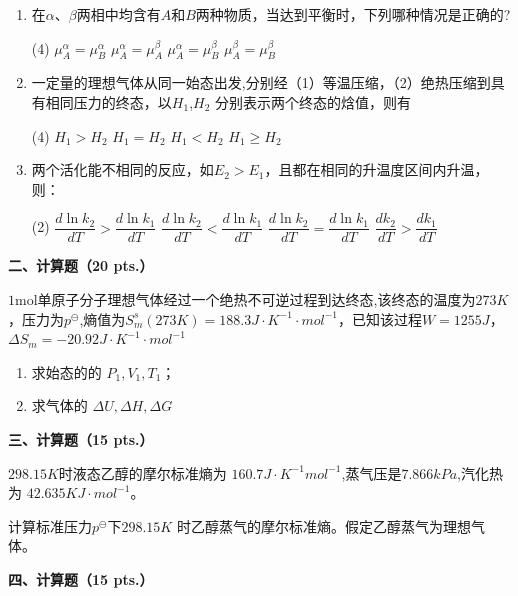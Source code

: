 \begin{enumerate}[label=\arabic*., itemsep=1.5ex]
\begin{tasks}
    \end{tasks}
    \item 在$\alpha$、$\beta$两相中均含有$A$和$B$两种物质，当达到平衡时，下列哪种情况是正确的?
    \begin{tasks}(4)
        \task $\mu_A^\alpha=\mu_B^\alpha$
        \task $\mu_A^\alpha=\mu_A^\beta$
        \task $\mu_A^\alpha=\mu_B^\beta$
        \task $\mu_A^\beta=\mu_B^\beta$
    \end{tasks}
    \item 一定量的理想气体从同一始态出发,分别经（1）等温压缩，（2）绝热压缩到具有相同压力的终态，以$H_1$,$H_2$ 分别表示两个终态的焓值，则有
    \begin{tasks}(4)
        \task $H_1>H_2$
        \task $H_1=H_2$
        \task $H_1<H_2$
        \task $H_1\geq H_2$
    \end{tasks}
    \item 两个活化能不相同的反应，如$E_2>E_1$，且都在相同的升温度区间内升温，则：
    \begin{tasks}(2)
        \task $\dfrac{d\ln k_2}{dT}>\dfrac{d\ln k_1}{dT}$
        \task $\dfrac{d\ln k_2}{dT}<\dfrac{d\ln k_1}{dT}$
        \task $\dfrac{d\ln k_2}{dT}=\dfrac{d\ln k_1}{dT}$
        \task $\dfrac{dk_2}{dT}>\dfrac{dk_1}{dT}$
    \end{tasks}
\end{enumerate}

\vspace{0.5cm}
\noindent\textbf{二、计算题（20 pts.）}

$1\mathrm{mol}$单原子分子理想气体经过一个绝热不可逆过程到达终态,该终态的温度为$273K$，压力为$p^\ominus$,熵值为$S_m^s(273K)=188.3J\cdot K^{-1}\cdot mol^{-1}$，已知该过程$W=1255J$，$\Delta S_m=-20.92J\cdot K^{-1}\cdot mol^{-1}$
\begin{enumerate}[label=(\arabic*), itemsep=1ex]
    \item 求始态的的 $P_1,V_1,T_1$；
    \item 求气体的 $\Delta U,\Delta H,\Delta G$
\end{enumerate}

\vspace{0.5cm}
\noindent\textbf{三、计算题（15 pts.）}

$298.15K$时液态乙醇的摩尔标准熵为 $160.7J\cdot K^{-1}mol^{-1}$,蒸气压是$7.866kPa$,汽化热为 $42.635KJ\cdot mol^{-1}$。

计算标准压力$p^\ominus$下$298.15K$ 时乙醇蒸气的摩尔标准熵。假定乙醇蒸气为理想气体。

\vspace{0.5cm}
\noindent\textbf{四、计算题（15 pts.）}

